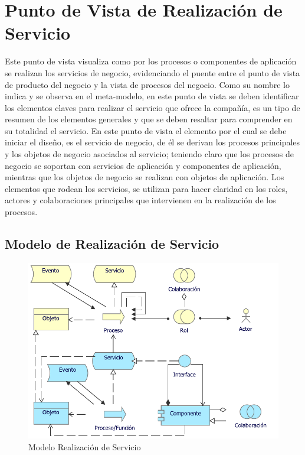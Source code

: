 \section{Punto de Vista de Realización de Servicio}

Este punto de vista visualiza como por los procesos o componentes de aplicación se realizan los servicios de negocio, evidenciando el puente entre el punto de vista de producto del negocio y la vista de procesos del negocio. Como su nombre lo indica y se observa en el meta-modelo, en este punto de vista se deben identificar los elementos claves para realizar el servicio que ofrece la compañía, es
un tipo de resumen de los elementos generales y que se deben resaltar para comprender en su totalidad el servicio. En este punto de vista el elemento por el cual se debe iniciar el diseño, es el servicio de negocio, de él se derivan los procesos principales y los objetos de negocio asociados al
servicio; teniendo claro que los procesos de negocio se soportan con servicios de aplicación y componentes de aplicación, mientras que los objetos de negocio se realizan con objetos de aplicación. Los elementos que rodean los servicios, se utilizan para hacer claridad en los roles, actores y colaboraciones principales que intervienen en la realización de los procesos.

\subsection{Modelo de Realización de Servicio}
\begin{figure}[h!]
	\centering
	\includegraphics[width=1\linewidth]{imgs/modelo/RealServicio}
	\caption{Modelo Realización de Servicio}
\end{figure}

